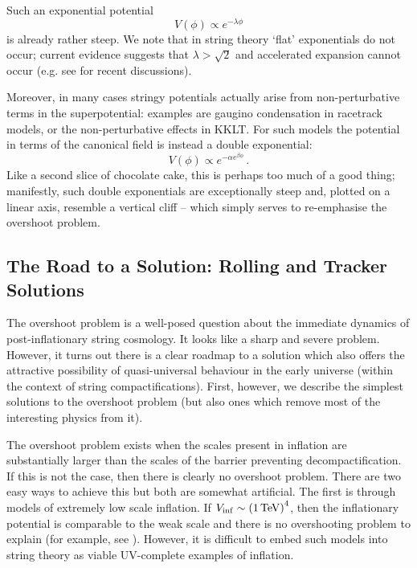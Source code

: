 Such an exponential potential
\begin{equation}
V(\phi) \propto e^{-\lambda \phi}
\end{equation}
is already rather steep. We note that in string theory `flat' exponentials do not occur; current evidence 
suggests that $\lambda > \sqrt{2}$ and accelerated expansion cannot occur (e.g. see \cite{Garg:2018zdg, Olguin-Trejo:2018zun, ValeixoBento:2020ujr, Cicoli:2021fsd, Rudelius:2022gbz, Calderon-Infante:2022nxb, Shiu:2023nph} for recent discussions).

Moreover, in many cases stringy potentials actually arise from non-perturbative terms in the superpotential: examples are gaugino condensation in racetrack models, or the non-perturbative effects in KKLT. For such models the potential in terms of the canonical field is instead a double exponential:
\begin{equation}
V(\phi) \propto e^{-\alpha e^{\beta \phi}}\,.
\end{equation}
Like a second slice of chocolate cake, this is perhaps too much of a good thing; manifestly, such double exponentials are exceptionally steep
and, plotted on a linear axis, resemble a vertical cliff -- which simply serves to re-emphasise the overshoot problem.

\subsection{The Road to a Solution: Rolling and Tracker Solutions}

The overshoot problem is a well-posed question about the immediate dynamics of post-inflationary string cosmology. It looks like a sharp and severe problem. However, it turns out there is a clear roadmap to a solution which also offers the attractive possibility of quasi-universal behaviour in the early universe (within the context of string compactifications). First, however, we describe the simplest solutions to the overshoot problem (but also ones which remove most of the interesting physics from it).

The overshoot problem exists when the scales present in inflation are substantially larger than the scales of the barrier preventing decompactification. If this is not the case, then there is clearly no overshoot problem. There are two easy ways to achieve this but both are somewhat artificial. The first is through models of extremely low scale inflation. If $V_{\rm inf} \sim \left( 1\, {\rm TeV} \right)^4$, then the inflationary potential is comparable to the weak scale and there is no overshooting problem to explain (for example, see \cite{hepph0103243, 09122324}).
However, it is difficult to embed such models into string theory as viable UV-complete examples of inflation.

